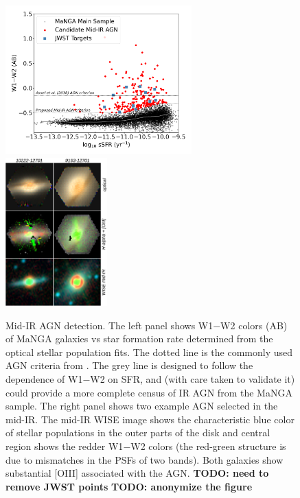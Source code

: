 \documentclass[12pt, preprint]{hacked-aastex}
\begin{document}
\begin{figure}[t!]
\includegraphics[width=0.64\textwidth]{w1w2-vs-ssfr.png}
\includegraphics[width=0.35\textwidth]{ir-grid.drawio.png}
  \vspace{-22pt}
    \caption{
\label{fig:wise} \small Mid-IR AGN detection. 
The left panel shows W1$-$W2 colors (AB) of MaNGA galaxies vs star
formation rate determined from the optical stellar population fits.
The dotted line is the commonly used AGN criteria from
\cite{assef18a}.  The grey line is designed to follow the dependence
of W1$-$W2 on SFR, and (with care taken to validate it) could provide
a more complete census of IR AGN from the MaNGA sample. The right
panel shows two example AGN selected in the mid-IR.  The mid-IR WISE
image shows the characteristic blue color of stellar populations in
the outer parts of the disk and central region shows the redder
W1$-$W2 colors (the red-green structure is due to mismatches in the
PSFs of two bands).  Both galaxies show substantial [OIII] associated
with the AGN.  {\bf TODO: need to remove JWST points} {\bf TODO:
  anonymize the figure}}
\end{figure}
\end{document}
